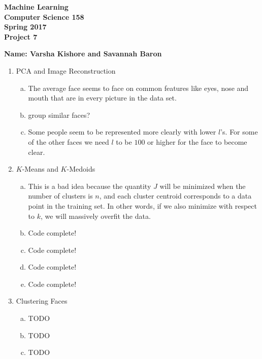 \documentclass[11pt]{article}
\begin{document}
\newcommand{\Name}[1]{\noindent \textbf{Name:} #1 \\}
\newcommand{\pderiv}[2]{\frac{\partial #1}{\partial #2}}
\newcommand{\psderiv}[3]{\frac{\partial^2 #1}{\partial #2 \partial #3}}

\begin{center}
	\bf
	Machine Learning \\
	Computer Science 158 \\
	Spring 2017 \\
	\rm
	Project 7\\
\end{center}
\noindent \textbf{Name: Varsha Kishore and Savannah Baron} \\

\begin{enumerate}[1]
\item PCA and Image Reconstruction
\begin{enumerate}[(a)]
\item The average face seems to face on common features like eyes, nose and mouth that are in every picture in the data set. 
\item group similar faces?
\item Some people seem to be represented more clearly with lower $l$'s. For some of the other faces we need $l$ to be $100$ or higher for the face to become clear. 
\end{enumerate}
\item $K$-Means and $K$-Medoids
\begin{enumerate}[(a)]
\item This is a bad idea because the quantity $J$ will be minimized when the number of clusters
is $n$, and each cluster centroid corresponds to a data point in the training set. In other words, if we
also minimize with respect to $k$, we will massively overfit the data. 
\item Code complete!
\item Code complete!
\item Code complete!
\item Code complete!
\end{enumerate}
\item Clustering Faces
\begin{enumerate}[(a)]
\item TODO
\item TODO
\item TODO
\end{enumerate}
\end{enumerate}
\end{document}
